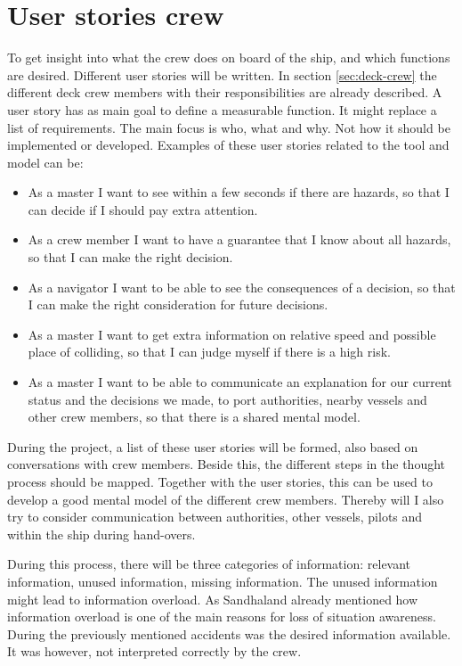 \section{User stories crew}
To get insight into what the crew does on board of the ship, and which functions are desired. Different user stories will be written. In section \ref{sec:deck-crew} the different deck crew members with their responsibilities are already described. 
A user story has as main goal to define a measurable function. It might replace a list of requirements. The main focus is who, what and why. Not how it should be implemented or developed. Examples of these user stories related to the tool and model can be:
\begin{itemize}
	\item As a master I want to see within a few seconds if there are hazards, so that I can decide if I should pay extra attention.
	\item As a crew member I want to have a guarantee that I know about all hazards, so that I can make the right decision.
	\item As a navigator I want to be able to see the consequences of a decision, so that I can make the right consideration for future decisions.
	\item As a master I want to get extra information on relative speed and possible place of colliding, so that I can judge myself if there is a high risk.
	\item As a master I want to be able to communicate an explanation for our current status and the decisions we made, to port authorities, nearby vessels and other crew members, so that there is a shared mental model.
\end{itemize}
During the project, a list of these user stories will be formed, also based on conversations with crew members. Beside this, the different steps in the thought process should be mapped. Together with the user stories, this can be used to develop a good mental model of the different crew members. 
Thereby will I also try to consider communication between authorities, other vessels, pilots and within the ship during hand-overs. 

During this process, there will be three categories of information: relevant information, unused information, missing information. The unused information might lead to information overload. As Sandhaland already mentioned how information overload is one of the main reasons for loss of situation awareness. During the previously mentioned accidents was the desired information available. It was however, not interpreted correctly by the crew.

